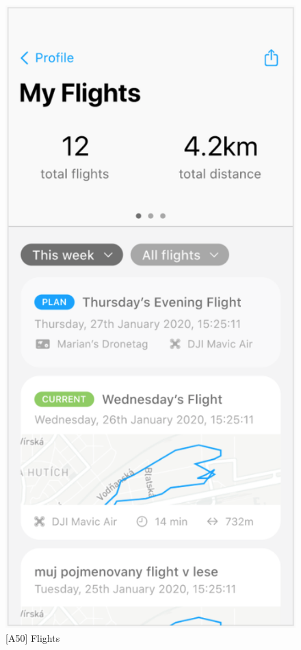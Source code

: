 \begin{figure}
    \centering
    \begin{minipage}{.45\textwidth}
        \centering
        \includegraphics[width=.7\linewidth]{assets/user_interface_design/flight/flights.png}
        \caption{[A50] Flights}
        \label{fig:flights}
    \end{minipage}%
    \hspace{.05\linewidth}
    \begin{minipage}{.45\textwidth}
        \centering

\end{minipage}
\end{figure}

